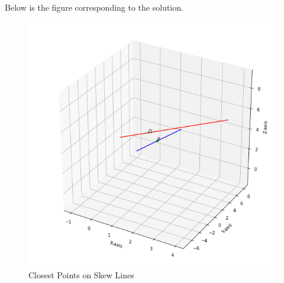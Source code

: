 \documentclass[journal,12pt,twocolumn]{IEEEtran}
\begin{document}
Below is the figure corresponding to the solution.
\renewcommand{\thefigure}{\arabic{figure}}
\begin{figure}[h!]
\centering
\includegraphics[width=\columnwidth]{Closest_Point.png}
\caption{Closest Points on Skew Lines}
\label{myfig}
\end{figure}\\
\end{document}
